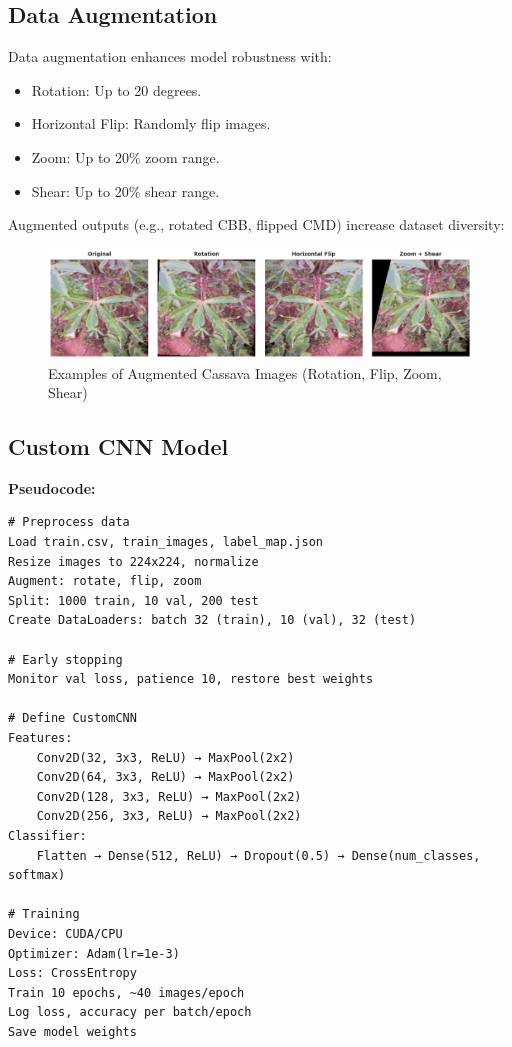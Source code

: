 \documentclass[a4paper,12pt]{article}
\begin{document}
\subsection*{Data Augmentation}
Data augmentation enhances model robustness with:
\begin{itemize}
    \item Rotation: Up to 20 degrees.
    \item Horizontal Flip: Randomly flip images.
    \item Zoom: Up to 20\% zoom range.
    \item Shear: Up to 20\% shear range.
\end{itemize}
Augmented outputs (e.g., rotated CBB, flipped CMD) increase dataset diversity:

\begin{figure}[H]
    \centering
    \includegraphics[width=1.0\textwidth]{./assets/cassava/data_aug.png}
    \caption{Examples of Augmented Cassava Images (Rotation, Flip, Zoom, Shear)}
\end{figure}

\subsection*{Custom CNN Model}
\textbf{Pseudocode:}
\begin{verbatim}
# Preprocess data
Load train.csv, train_images, label_map.json
Resize images to 224x224, normalize
Augment: rotate, flip, zoom
Split: 1000 train, 10 val, 200 test
Create DataLoaders: batch 32 (train), 10 (val), 32 (test)

# Early stopping
Monitor val loss, patience 10, restore best weights

# Define CustomCNN
Features:
    Conv2D(32, 3x3, ReLU) → MaxPool(2x2)
    Conv2D(64, 3x3, ReLU) → MaxPool(2x2)
    Conv2D(128, 3x3, ReLU) → MaxPool(2x2)
    Conv2D(256, 3x3, ReLU) → MaxPool(2x2)
Classifier:
    Flatten → Dense(512, ReLU) → Dropout(0.5) → Dense(num_classes, softmax)

# Training
Device: CUDA/CPU
Optimizer: Adam(lr=1e-3)
Loss: CrossEntropy
Train 10 epochs, ~40 images/epoch
Log loss, accuracy per batch/epoch
Save model weights
\end{verbatim}
\end{document}
